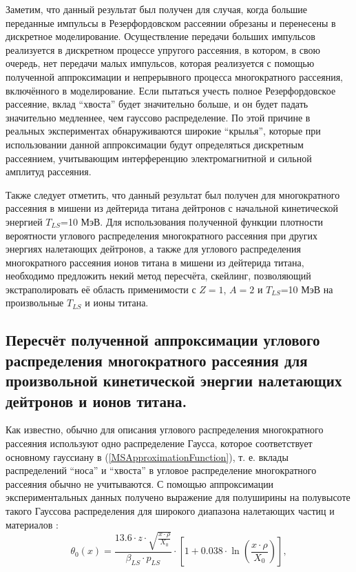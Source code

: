 \documentclass[a4paper,12pt]{article}
\begin{document}
\begin{large}
	Заметим, что данный результат был получен для случая, когда большие переданные импульсы в Резерфордовском рассеянии обрезаны и перенесены в дискретное моделирование.
	Осуществление передачи больших импульсов реализуется в дискретном процессе упругого рассеяния, в котором, в свою очередь, нет передачи малых импульсов, которая реализуется с помощью полученной аппроксимации и непрерывного процесса многократного рассеяния, включённого в моделирование.
  	Если пытаться учесть полное Резерфордовское рассеяние, вклад ``хвоста'' будет значительно больше, и он будет падать значительно медленнее, чем гауссово распределение.
  	По этой причине в реальных экспериментах обнаруживаются широкие ``крылья'', которые при использовании данной аппроксимации будут определяться дискретным рассеянием, учитывающим интерференцию электромагнитной и сильной амплитуд рассеяния.
  
  	Также следует отметить, что данный результат был получен для многократного рассеяния в мишени из дейтерида титана дейтронов с начальной кинетической энергией $T_{LS}$=10 МэВ.
  	Для использования полученной функции плотности вероятности углового распределения многократного рассеяния при других энергиях налетающих дейтронов, а также для углового распределения многократного рассеяния ионов титана в мишени из дейтерида титана, необходимо предложить некий метод пересчёта, скейлинг, позволяющий экстраполировать её область применимости с $Z=1$, $A=2$ и $T_{LS}$=10 МэВ на произвольные $T_{LS}$ и ионы титана.
  
\subsection{Пересчёт полученной аппроксимации углового распределения многократного рассеяния для произвольной кинетической энергии налетающих дейтронов и ионов титана.}
\label{subValMS2}

	Как известно, обычно для описания углового распределения многократного рассеяния используют одно распределение Гаусса, которое соответствует основному гауссиану в  (\ref{MSApproximationFunction}), т. е. вклады распределений ``носа'' и ``хвоста'' в угловое распределение многократного рассеяния обычно не учитываются.
	С помощью аппроксимации экспериментальных данных получено выражение для полуширины на полувысоте такого Гауссова распределения для широкого диапазона налетающих частиц и материалов \cite{PDG}:
\begin{equation}
  \label{Theta0}
  \theta_0(x)=\frac{13.6 \cdot z \cdot \sqrt{\frac{x\cdot \rho}{X_0}}}{\beta_{LS}\cdot p_{LS}}\cdot\left[ 1+0.038\cdot\ln\left(\frac{x\cdot \rho}{X_0}\right)\right],
\end{equation}	


\end{large}
\end{document}
